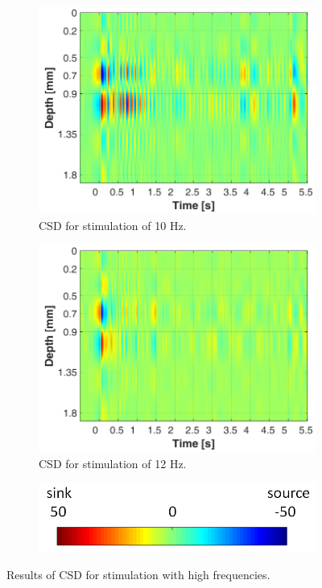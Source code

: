 \documentclass{pracalicmgr}
\begin{document}
\begin{figure}[H]
	\begin{subfigure}{.5\textwidth}
		\centering
		\includegraphics[width=1.\linewidth]{csd_10Hz_5s.png}
		\caption{CSD for stimulation of 10 Hz.}
		\label{rys:csd_10Hz}
	\end{subfigure}
	\begin{subfigure}{.5\textwidth}
		\centering
		\includegraphics[width=1.\linewidth]{csd_12Hz_5s.png}
		\caption{CSD for stimulation of 12 Hz.}
		\label{rys:csd_12Hz}
	\end{subfigure}
	
	\begin{subfigure}{\textwidth}
	\centering
	\includegraphics[scale=0.4]{legend2.png}
	\end{subfigure}
	
	\caption{Results of CSD for stimulation with high frequencies.}
	\label{rys:csd}
	
	\end{figure}
\end{document}
